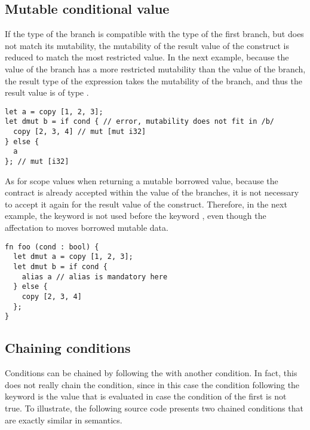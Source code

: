 \subsection{Mutable conditional value}

If the type of the  branch is compatible with the type of the first
branch, but does not match its mutability, the mutability of the result value of
the  construct is reduced to match the most restricted value. In the
next example, because the value of the  branch has a more
restricted mutability than the value of the  branch, the result type
of the expression takes the mutability of the  branch, and thus the
result value is of type .

\begin{lstlisting}[style=coloredverbatim]
let a = copy [1, 2, 3];
let dmut b = if cond { // error, mutability does not fit in /b/
  copy [2, 3, 4] // mut [mut i32]
} else {
  a
}; // mut [i32]
\end{lstlisting}

As for scope values when returning a mutable borrowed value, because
the  contract is already accepted within the value of the
branches, it is not necessary to accept it again for the result value of the
 construct. Therefore, in the next example, the keyword
 is not used before the keyword , even though the
affectation to  moves borrowed mutable data.

\begin{lstlisting}[style=coloredverbatim]
fn foo (cond : bool) {
  let dmut a = copy [1, 2, 3];
  let dmut b = if cond {
    alias a // alias is mandatory here
  } else {
    copy [2, 3, 4]
  };
}
\end{lstlisting}


\subsection{Chaining conditions}

Conditions can be chained by following the  with another
 condition. In fact, this does not really chain the condition, since
in this case the  condition following the  keyword is
the value that is evaluated in case the condition of the first  is
not true. To illustrate, the following source code presents two chained
 conditions that are exactly similar in semantics.


